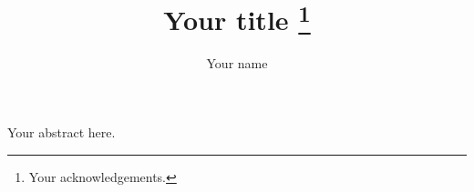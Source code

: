 \documentclass[letterpaper]{easychair}
\title{Your title%
\thanks{Your acknowledgements.}
}
\author{
Your name \inst{1}
}
\institute{
  Your Institute or University\\
  \email{your@email.address}
}
\begin{document}
\maketitle

Your abstract here.
\end{document}
